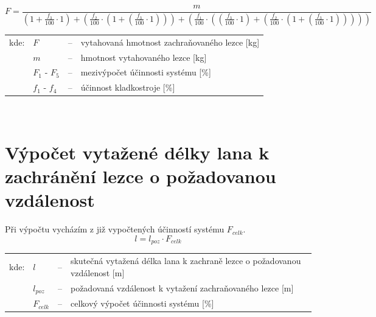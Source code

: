 \begin{equation}
    \label{eqn:10_calculation_7_1}
    F = \frac{m}{(1 + \frac{f_3}{100} \cdot 1) + (\frac{f_2}{100} \cdot (1 + (\frac{f_3}{100} \cdot 1))) + (\frac{f_1}{100} \cdot ((\frac{f_3}{100} \cdot 1) + (\frac{f_2}{100} \cdot (1 + (\frac{f_3}{100} \cdot 1)))))}
\end{equation}

\begin{tabular}{l l c p{9.75cm}}
    kde: \hspace{0.25cm} & $F$ & -- & vytahovaná hmotnost zachraňovaného lezce [kg]\\
    \hspace{0.25cm} & $m$ & -- & hmotnost vytahovaného lezce [kg]\\
    \hspace{0.25cm} & $F_1$ - $F_5$ & -- & mezivýpočet účinnosti systému [\%]\\
    \hspace{0.25cm} & $f_1$ - $f_4$ & -- & účinnost kladkostroje [\%]\\
\end{tabular}
\\
\section{Výpočet vytažené délky lana k zachránění lezce o požadovanou vzdálenost}
Při výpočtu vycházím z již vypočtených účinností systému $F_{celk}$.
\begin{equation}
    \label{eqn:calculation_distance}
    l = l_{poz} \cdot F_{celk}
\end{equation}

\begin{tabular}{l l c p{9.75cm}}
    kde: \hspace{0.25cm} & $l$ & -- & skutečná vytažená délka lana k zachraně lezce o požadovanou vzdálenost [m]\\
    \hspace{0.25cm} & $l_{poz}$ & -- & požadovaná vzdálenost k vytažení zachraňovaného lezce [m]\\
    \hspace{0.25cm} & $F_{celk}$ & -- & celkový výpočet účinnosti systému [\%]\\
\end{tabular}